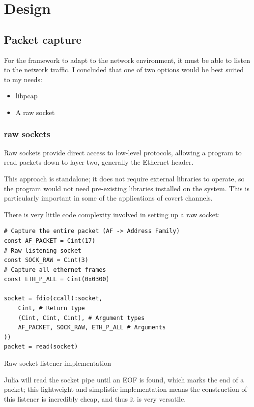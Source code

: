 \chapter{Design}
\label{ch:design}

\section{Packet capture}
\label{sec:packet_capture}

For the framework to adapt to the network environment, it must be able to listen to the network traffic.
I concluded that one of two options would be best suited to my needs:
\begin{itemize}
    \item libpcap
    \item A raw socket
\end{itemize}

\subsection{raw sockets}

Raw sockets provide direct access to low-level protocols, allowing a program to read packets down to layer two, generally the Ethernet header. 

This approach is standalone; it does not require external libraries to operate, so the program would not need pre-existing libraries installed on the system. This is particularly important in some of the applications of covert channels.

There is very little code complexity involved in setting up a raw socket:

\begin{listing}
    \vspace{0.5cm}
    \begin{verbatim}
# Capture the entire packet (AF -> Address Family)
const AF_PACKET = Cint(17) 
# Raw listening socket
const SOCK_RAW = Cint(3)
# Capture all ethernet frames
const ETH_P_ALL = Cint(0x0300)

socket = fdio(ccall(:socket,
    Cint, # Return type
    (Cint, Cint, Cint), # Argument types
    AF_PACKET, SOCK_RAW, ETH_P_ALL # Arguments
))
packet = read(socket)
    \end{verbatim}
    \caption{Raw socket listener implementation}
    \label{lst:raw_sock}
\end{listing}

Julia will read the socket pipe until an EOF is found, which marks the end of a packet; this lightweight and simplistic implementation means the construction of this listener is incredibly cheap, and thus it is very versatile.

